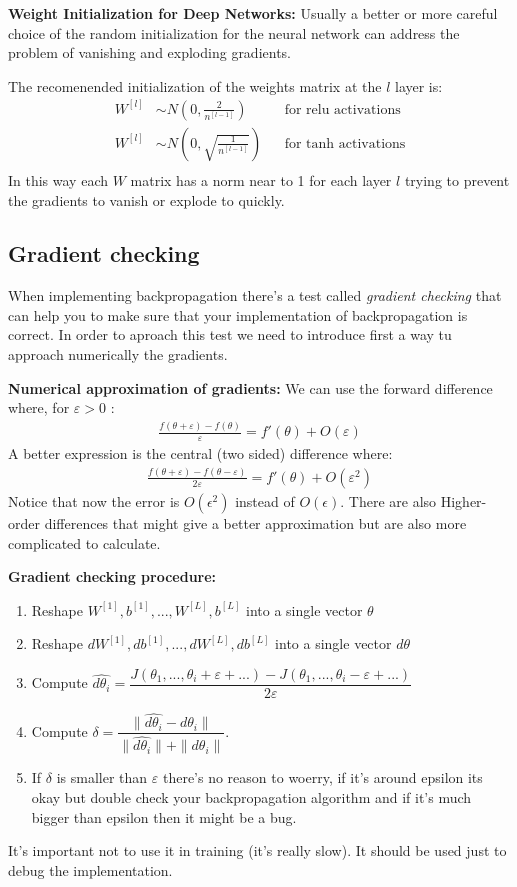 \textbf{Weight Initialization for Deep Networks:} Usually a better or more careful
choice of the random initialization for the neural network can address the problem of
vanishing and exploding gradients.

The recomenended initialization of the weights matrix at the $l$ layer is:
\begin{align*}
    W^{[l]} &\sim N\left(0, \frac{2}{n^{[l-1]}}\right) && \text{for relu activations} \\
    W^{[l]} &\sim N\left(0, \sqrt{\frac{1}{n^{[l-1]}}}\right) && \text{for tanh activations} \\
\end{align*}
In this way each $W$ matrix has a norm near to 1 for each layer $l$ trying to prevent
the gradients to vanish or explode to quickly.

\subsection*{Gradient checking}
When implementing backpropagation there's a test called \textit{gradient checking} that
can help you to make sure that your implementation of backpropagation is correct. In 
order to aproach this test we need to introduce first a way tu approach numerically 
the gradients.

\textbf{Numerical approximation of gradients:} We can use the forward difference where, 
for $\varepsilon > 0$ :
\begin{align*}
    \frac{f(\theta + \varepsilon) - f(\theta)}{\varepsilon} = f'(\theta) + O(\varepsilon)
\end{align*}
A better expression is the central (two sided) difference where:
\begin{align*}
    \frac{f(\theta + \varepsilon) - f(\theta - \varepsilon)}{2 \varepsilon} = f'(\theta) + O(\varepsilon^2)
\end{align*}
Notice that now the error is $O(\epsilon^2)$ instead of $O(\epsilon)$. There are also
Higher-order differences that might give a better approximation but are also more complicated
to calculate.

\textbf{Gradient checking procedure:}

\begin{enumerate}
    \item Reshape $W^{[1]}, b^{[1]}, ..., W^{[L]}, b^{[L]}$ into a single vector $\theta$
    \item Reshape $dW^{[1]}, db^{[1]}, ..., dW^{[L]}, db^{[L]}$ into a single vector $d\theta$
    \item Compute $\hat{d\theta_i} = \dfrac{J(\theta_1, ..., \theta_i+\varepsilon + ...) - J(\theta_1, ..., \theta_i-\varepsilon + ...)}{2 \varepsilon}$
    \item Compute $\delta = \dfrac{ \|\hat{d\theta_i} - d\theta_i\|}{\| \hat{d\theta_i} \| + \| d\theta_i \|}$.
    \item If $\delta$ is smaller than $\varepsilon$ there's no reason to woerry, if it's 
    around epsilon its okay but double check your backpropagation algorithm and if it's 
    much bigger than epsilon then it might be a bug.
\end{enumerate}

It's important not to use it in training (it's really slow). It should be used just 
to debug the implementation.


